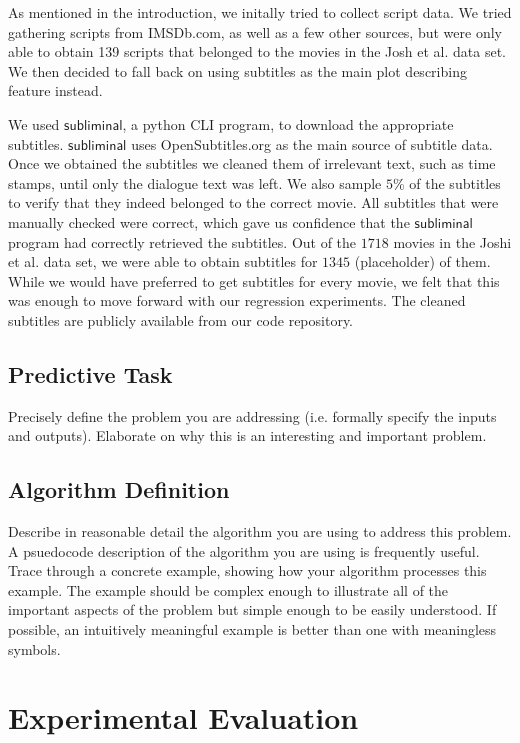 \documentclass[11pt]{article}
\begin{document}
As mentioned in the introduction, we initally tried to collect script data. We tried
gathering scripts from IMSDb.com, as well as a few other sources, but were only able
to obtain 139 scripts that belonged to the movies in the Josh et al. data set. We then
decided to fall back on using subtitles as the main plot describing feature instead.

We used $\mathsf{subliminal}$, a python CLI program, to download the appropriate
subtitles. $\mathsf{subliminal}$ uses OpenSubtitles.org as the main source of subtitle
data. Once we obtained the subtitles we cleaned them of irrelevant text, such as time
stamps, until only the dialogue text was left. We also sample $5$\% of the subtitles to
verify that they indeed belonged to the correct movie. All subtitles that were manually
checked were correct, which gave us confidence that the $\mathsf{subliminal}$ program
had correctly retrieved the subtitles. Out of the $1718$ movies in the Joshi
et al. data set, we were able to obtain subtitles for $1345$ (placeholder) of them.
While we would have preferred to get subtitles for every movie, we felt that this was
enough to move forward with our regression experiments. The cleaned subtitles are
publicly available from our code repository.


\subsection{Predictive Task}
Precisely define the problem you are addressing (i.e. formally specify the inputs and
outputs). Elaborate on why this is an interesting and important problem.

\subsection{Algorithm Definition}
Describe in reasonable detail the algorithm you are using to address this problem. A
psuedocode description of the algorithm you are using is frequently useful. Trace through
a concrete example, showing how your algorithm processes this example. The example should
be complex enough to illustrate all of the important aspects of the problem but simple
enough to be easily understood. If possible, an intuitively meaningful example is better
than one with meaningless symbols.

\section{Experimental Evaluation}
\end{document}

